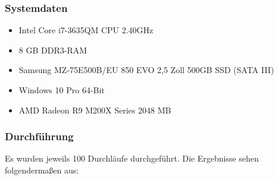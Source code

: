 \subsubsection{Systemdaten}
\begin{itemize}
\item Intel Core i7-3635QM CPU 2.40GHz
\item 8 GB DDR3-RAM
\item Samsung MZ-75E500B/EU 850 EVO 2,5 Zoll 500GB SSD (SATA III)
\item Windows 10 Pro 64-Bit
\item AMD Radeon R9 M200X Series 2048 MB
\end{itemize}
\subsubsection{Durchführung}
Es wurden jeweils 100 Durchläufe durchgeführt.
Die Ergebnisse sehen folgendermaßen aus:

